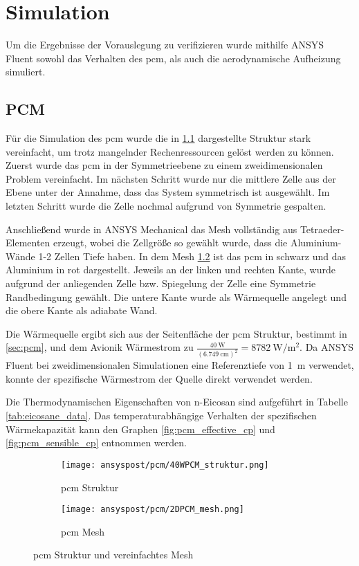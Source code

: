 \chapter{Simulation}\label{chap:Simulation}

Um die Ergebnisse der Vorauslegung zu verifizieren wurde mithilfe ANSYS Fluent sowohl das Verhalten des \ac{pcm}, als auch die
aerodynamische Aufheizung simuliert.

\section{PCM}\label{sec:sim_pcm}

Für die Simulation des \ac{pcm} wurde die in \ref{fig:pcm_struktur} dargestellte Struktur stark vereinfacht,
um trotz mangelnder Rechenressourcen gelöst werden zu können. Zuerst wurde das \ac{pcm} in der Symmetrieebene
zu einem zweidimensionalen Problem vereinfacht. Im nächsten Schritt wurde nur die mittlere Zelle aus der Ebene unter der Annahme,
dass das System symmetrisch ist ausgewählt. Im letzten Schritt wurde die Zelle nochmal aufgrund von Symmetrie gespalten.

Anschließend wurde in ANSYS Mechanical das Mesh vollständig aus Tetraeder-Elementen erzeugt, wobei die Zellgröße so gewählt
wurde, dass die Aluminium-Wände 1-2 Zellen Tiefe haben. In dem Mesh \ref{fig:pcm_mesh} ist das \ac{pcm} in schwarz und das Aluminium
in rot dargestellt. Jeweils an der linken und rechten Kante, wurde aufgrund der anliegenden Zelle bzw. Spiegelung der Zelle eine
Symmetrie Randbedingung gewählt. Die untere Kante wurde als Wärmequelle angelegt und die obere Kante als adiabate Wand.

Die Wärmequelle ergibt sich aus der Seitenfläche der \ac{pcm} Struktur, bestimmt in \ref{sec:pcm}, und dem Avionik Wärmestrom zu
$\frac{\SI{40}{\watt}}{\left(\SI{6,749}{\centi\meter}\right)^2} = \SI{8782}{\watt\per\meter\squared}$.
Da ANSYS Fluent bei zweidimensionalen Simulationen eine Referenztiefe von \SI{1}{m} verwendet, konnte der spezifische Wärmestrom
der Quelle direkt verwendet werden.

Die Thermodynamischen Eigenschaften von n-Eicosan sind aufgeführt in Tabelle \ref{tab:eicosane_data}.
Das temperaturabhängige Verhalten der spezifischen Wärmekapazität kann den Graphen \ref{fig:pcm_effective_cp} und \ref{fig:pcm_sensible_cp}
entnommen werden.

\begin{figure}[!htb]
    \centering
    \begin{subfigure}[t]{0.7\textwidth}
        \centering
        \texttt{[image: ansyspost/pcm/40WPCM\_struktur.png]}
        \caption{\ac{pcm} Struktur}\label{fig:pcm_struktur}
    \end{subfigure}
    \hfill
    \begin{subfigure}[t]{0.15\textwidth}
        \centering
        \texttt{[image: ansyspost/pcm/2DPCM\_mesh.png]}
        \caption{\ac{pcm} Mesh}\label{fig:pcm_mesh}
    \end{subfigure}
    \caption{\ac{pcm} Struktur und vereinfachtes Mesh}\label{fig:pcm_geometrien}
\end{figure}

